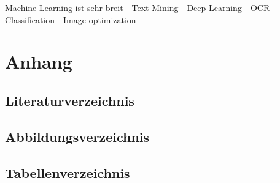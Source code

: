 \documentclass[12pt, twoside, table]{extarticle}
\begin{document}
Machine Learning ist sehr breit
  - Text Mining
  - Deep Learning
  - OCR
  - Classification
  - Image optimization
  
\newpage
\section{Anhang}

\subsection{Literaturverzeichnis}
{
    \renewcommand{\section}[2]{}%
    
}


\newpage
\subsection{Abbildungsverzeichnis}
{
    \renewcommand{\section}[2]{}%
    \listoffigures
}

\newpage
\subsection{Tabellenverzeichnis}
{
    \renewcommand{\section}[2]{}%
    \listoftables
}
\end{document}
